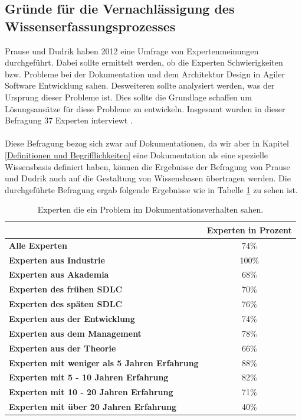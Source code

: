 \documentclass[a4paper,12pt]{scrartcl}
\begin{document}
\subsection{Gründe für die Vernachlässigung des Wissenserfassungsprozesses}
Prause und Dudrik haben 2012 eine Umfrage von Expertenmeinungen durchgeführt. Dabei sollte ermittelt werden, ob die Experten Schwierigkeiten bzw. Probleme bei der Dokumentation und dem Architektur Design in Agiler Software Entwicklung sahen. Desweiteren sollte analysiert werden, was der Ursprung dieser Probleme ist. Dies sollte die Grundlage schaffen um Lösungsansätze für diese Probleme zu entwickeln. Insgesamt wurden in dieser Befragung 37 Experten interviewt \cite{Prause2012}.
\\\\
Diese Befragung bezog sich zwar auf Dokumentationen, da wir aber in Kapitel \ref{Definitionen und Begrifflichkeiten} eine Dokumentation als eine spezielle Wissensbasis definiert haben, können die Ergebnisse der Befragung von Prause und Dudrik auch auf die Gestaltung von Wissensbasen übertragen werden. Die durchgeführte Befragung ergab folgende Ergebnisse wie in Tabelle \ref{ProblemTabelle} zu sehen ist.
\begin{table}[htb]
\begin{tabular}{|l|c|}\hline
\rule{0pt}{15pt}  & \textbf{Experten in Prozent}
\\
\hline
\rule{0pt}{15pt} \textbf{Alle Experten} & 74\%\\ 
\hline
\rule{0pt}{15pt} \textbf{Experten aus Industrie} & 100\% \\
\hline
\rule{0pt}{15pt} \textbf{Experten aus Akademia} & 68\%\\
\hline
\rule{0pt}{15pt} \textbf{Experten des frühen SDLC} & 70\%\\
\hline
\rule{0pt}{15pt} \textbf{Experten des späten SDLC} & 76\%\\
\hline
\rule{0pt}{15pt} \textbf{Experten aus der Entwicklung} & 74\%\\
\hline
\rule{0pt}{15pt} \textbf{Experten aus dem Management} & 78\%\\
\hline
\rule{0pt}{15pt} \textbf{Experten aus der Theorie} & 66\%\\
\hline
\rule{0pt}{15pt} \textbf{Experten mit weniger als 5 Jahren Erfahrung} & 88\%\\
\hline
\rule{0pt}{15pt} \textbf{Experten mit 5 - 10 Jahren Erfahrung} & 82\%\\
\hline
\rule{0pt}{15pt} \textbf{Experten mit 10 - 20 Jahren Erfahrung} & 71\%\\
\hline
\rule{0pt}{15pt} \textbf{Experten mit über 20 Jahren Erfahrung} & 40\%\\
\hline
\end{tabular}
\caption{Experten die ein Problem im Dokumentationsverhalten sahen.}
\label{ProblemTabelle}
\end{table}
\end{document}
